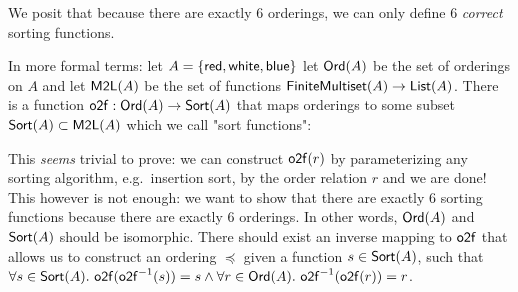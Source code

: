 We posit that because there are exactly 6 orderings, we can only define 6 \emph{correct} sorting
functions.%

In more formal terms: let $A = \{\operatorname{\mathsf{red}}, \operatorname{\mathsf{white}}, \operatorname{\mathsf{blue}}\}$
let $\operatorname{\mathsf{Ord}}(A)$ be the set of orderings on $A$ and let 
 $\operatorname{\mathsf{M2L}}(A)$  be the set of functions $\operatorname{\mathsf{FiniteMultiset}}(A) \to \operatorname{\mathsf{List}}(A)$.
There is a function $\operatorname{\mathsf{o2f}} : \operatorname{\mathsf{Ord}}(A) \to \operatorname{\mathsf{Sort}}(A)$ that maps orderings to
some subset $\operatorname{\mathsf{Sort}}(A) \subset \operatorname{\mathsf{M2L}}(A)$ which we call "sort functions":

\begin{center}
\end{center}

This \textit{seems} trivial to prove: we can construct $\operatorname{\mathsf{o2f}}(r)$ by parameterizing
any sorting algorithm, e.g.\ insertion sort, by the order relation $r$ and we are done!
This however is not enough: we want to show that there are exactly 6 sorting functions because
there are exactly 6 orderings. In other words, $\operatorname{\mathsf{Ord}}(A)$ and $\operatorname{\mathsf{Sort}}(A)$ should be
isomorphic. There should exist an inverse mapping to $\operatorname{\mathsf{o2f}}$ that allows us to construct
an ordering $\preccurlyeq$ given a function $s \in \operatorname{\mathsf{Sort}}(A)$, such that
$\forall s \in \operatorname{\mathsf{Sort}}(A).\, \operatorname{\mathsf{o2f}}(\operatorname{\mathsf{o2f}}^{-1}(s)) = s \land \forall r \in \operatorname{\mathsf{Ord}}(A).\, \operatorname{\mathsf{o2f}}^{-1}(\operatorname{\mathsf{o2f}}(r)) = r$.

